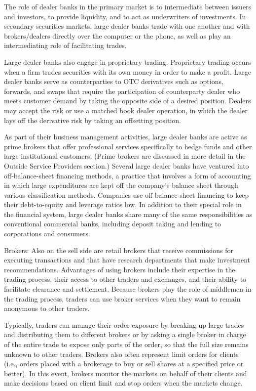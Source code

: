 \documentclass[11pt]{article}
\begin{document}
The role of dealer banks in the primary market is to intermediate between issuers and investors, to provide liquidity, and to act as underwriters of investments. In secondary securities markets, large dealer banks trade with one another and with brokers/dealers directly over the computer or the phone, as well as play an intermediating role of facilitating trades.

Large dealer banks also engage in proprietary trading. Proprietary trading occurs when a firm trades securities with its own money in order to make a profit. Large dealer banks serve as counterparties to OTC derivatives such as options, forwards, and swaps that require the participation of counterparty dealer who meets customer demand by taking the opposite side of a desired position. Dealers may accept the risk or use a matched book dealer operation, in which the dealer lays off the derivative risk by taking an offsetting position.

As part of their business management activities, large dealer banks are active as prime brokers that offer professional services specifically to hedge funds and other large institutional customers. (Prime brokers are discussed in more detail in the Outside Service Providers section.) Several large dealer banks have ventured into off-balance-sheet financing methods, a practice that involves a form of accounting in which large expenditures are kept off the company's balance sheet through various classification methods. Companies use off-balance-sheet financing to keep their debt-to-equity and leverage ratios low. In addition to their special role in the financial system, large dealer banks share many of the same responsibilities as conventional commercial banks, including deposit taking and lending to corporations and consumers.

Brokers: Also on the sell side are retail brokers that receive commissions for executing transactions and that have research departments that make investment recommendations. Advantages of using brokers include their expertise in the trading process, their access to other traders and exchanges, and their ability to facilitate clearance and settlement. Because brokers play the role of middlemen in the trading process, traders can use broker services when they want to remain anonymous to other traders.

Typically, traders can manage their order exposure by breaking up large trades and distributing them to different brokers or by asking a single broker in charge of the entire trade to expose only parts of the order, so that the full size remains unknown to other traders. Brokers also often represent limit orders for clients (i.e., orders placed with a brokerage to buy or sell shares at a specified price or better). In this event, brokers monitor the markets on behalf of their clients and make decisions based on client limit and stop orders when the markets change.
\end{document}
